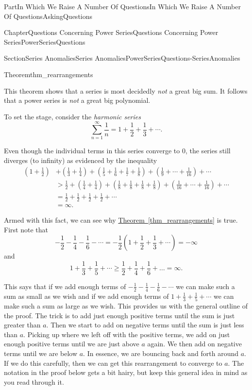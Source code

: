 \documentclass[oneside,10pt,]{book}
\newcommand{\xreffont}{\relax}
\numberwithin{equation}{part}
\newcommand{\amp}{&}
\begin{document}
\begin{partptx}{Part}{In Which We Raise A Number Of Questions}{}{In Which We Raise A Number Of Questions}{}{}{AskingQuestions}
\begin{chapterptx}{Chapter}{Questions Concerning Power Series}{}{Questions Concerning Power Series}{}{}{PowerSeriesQuestions}
\begin{sectionptx}{Section}{Series Anomalies}{}{Series Anomalies}{}{}{PowerSeriesQuestions-SeriesAnomalies}
\begin{theorem}{Theorem}{}{}{thm_rearrangements}
\end{theorem}
This theorem shows that a series is most decidedly \emph{not} a great big sum. It follows that a power series is \emph{not} a great big polynomial.%
\par
To set the stage, consider the \emph{harmonic series} %
\begin{equation*}
\sum_{n=1}^\infty\frac{1}{n}=1+\frac{1}{2}+\frac{1}{3}+\cdots\text{.}
\end{equation*}
%
\par
Even though the individual terms in this series converge to \(0\), the series still diverges (to infinity) as evidenced by the inequality%
\begin{align*}
\left(1+\frac{1}{2}\right)\amp +\left(\frac{1}{3}+\frac{1}{4}\right)+\left(\frac{1}{5}+\frac{1}{6}+ \frac{1}{7}+\frac{1}{8}\right)+\left(\frac{1}{9}+\cdots+\frac{1}{16}\right)+\cdots\\
\amp >\frac{1}{2}+\left(\frac{1}{4}+\frac{1}{4}\right)+\left(\frac{1}{8}+ \frac{1}{8}+\frac{1}{8}+\frac{1}{8}\right)+\left(\frac{1}{16}+\cdots+\frac{1}{16}\right)+\cdots\\
\amp =\frac{1}{2}+\frac{1}{2}+\frac{1}{2}+\frac{1}{2}+\cdots\\
\amp =   \infty\text{.}
\end{align*}
%
\par
Armed with this fact, we can see why \hyperref[thm_rearrangements]{Theorem~{\xreffont\ref{thm_rearrangements}}} is true. First note that%
\begin{equation*}
-\frac{1}{2}-\frac{1}{4}-\frac{1}{6}-\cdots=-\frac{1}{2}(1+\frac{1}{2}+ \frac{1}{3}+\cdots)=-\infty
\end{equation*}
and%
\begin{equation*}
1+\frac{1}{3}+\frac{1}{5}+\cdots\geq\frac{1}{2}+\frac{1}{4}+\frac{1}{6}+\ldots= \infty\text{.}
\end{equation*}
%
\par
This says that if we add enough terms of \(-\frac{1}{2}-\frac{1}{4}-\frac{1}{6}-\cdots\) we can make such a sum as small as we wish and if we add enough terms of \(1+\frac{1}{3}+\frac{1}{5}+\cdots\) we can make such a sum as large as we wish. This provides us with the general outline of the proof. The trick is to add just enough positive terms until the sum is just greater than \(a\). Then we start to add on negative terms until the sum is just less than \(a\). Picking up where we left off with the positive terms, we add on just enough positive terms until we are just above \(a\) again. We then add on negative terms until we are below \(a\). In essence, we are bouncing back and forth around \(a\). If we do this carefully, then we can get this rearrangement to converge to \(a\). The notation in the proof below gets a bit hairy, but keep this general idea in mind as you read through it.%

\end{sectionptx}
\end{chapterptx}
\end{partptx}
\end{document}
